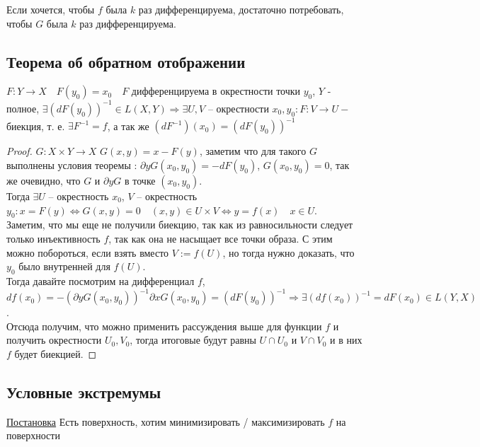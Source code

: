 \follow Если хочется, чтобы $f$ была $k$ раз дифференцируема, достаточно потребовать, чтобы $G$ была $k$ раз дифференцируема.

\subsection{Теорема об обратном отображении}
\begin{theorem}
    $F \colon Y \to X \quad F(y_0) = x_0 \quad F$ дифференцируема в окрестности точки $y_0$, $Y$ - полное, $\exists (d F(y_0))^{-1} \in L(X, Y) \Rightarrow \exists U, V$ -- окрестности $x_0, y_0 \colon F \colon V \to U -$ биекция, т. е. $\exists F^{-1} = f$, а так же $(dF^{-1})(x_0) = (d F(y_0))^{-1}$
\end{theorem}
\begin{proof}
    $G \colon X \times Y \to X$ $G(x, y) = x - F(y)$, заметим что для такого $G$ выполнены условия теоремы : $\partial y G(x_0, y_0) = -d F(y_0)$, $G(x_0, y_0) = 0$, так же очевидно, что $G$ и $\partial y G$ в точке $(x_0, y_0)$.\\
    Тогда $\exists U$ -- окрестность $x_0$, $V$ -- окрестность $y_0 \colon x = F(y) \Leftrightarrow G(x, y) = 0 \quad (x, y) \in U \times V \Leftrightarrow y = f(x) \quad x \in U$.\\
    Заметим, что мы еще не получили биекцию, так как из равносильности следует только инъективность $f$, так как она не насыщает все точки образа. С этим можно побороться, если взять вместо $V := f(U)$, но тогда нужно доказать, что $y_0$ было внутренней для $f(U)$.\\
    Тогда давайте посмотрим на дифференциал $f$, $df(x_0) = -(\partial y G(x_0, y_0))^{-1} \partial x G(x_0, y_0) = (d F(y_0))^{-1} \Rightarrow \exists (d f(x_0))^{-1} = d F(x_0) \in L(Y, X)$.\\
    Отсюда получим, что можно применить рассуждения выше для функции $f$ и получить окрестности $U_0, V_0$, тогда итоговые будут равны $U \cap U_0$ и $V \cap V_0$ и в них $f$ будет биекцией.
\end{proof}

\subsection{Условные экстремумы}

\underline{Постановка} Есть поверхность, хотим минимизировать / максимизировать $f$ на поверхности


